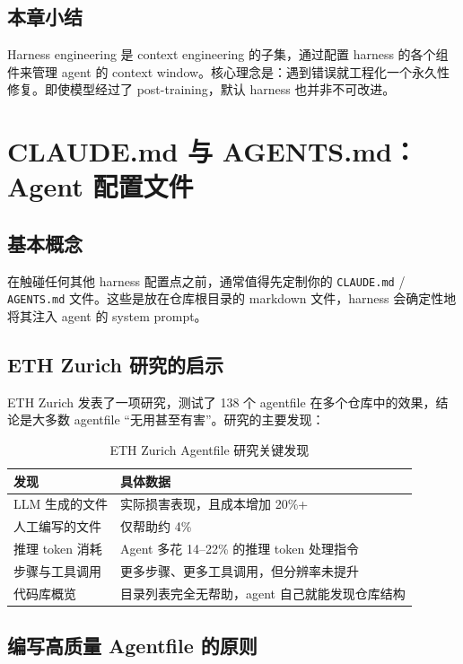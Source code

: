 \documentclass[a4paper]{article}
\begin{document}
\subsection{本章小结}

Harness engineering 是 context engineering 的子集，通过配置 harness 的各个组件来管理 agent 的 context window。核心理念是：遇到错误就工程化一个永久性修复。即使模型经过了 post-training，默认 harness 也并非不可改进。


\section{CLAUDE.md 与 AGENTS.md：Agent 配置文件}

\subsection{基本概念}

在触碰任何其他 harness 配置点之前，通常值得先定制你的 \texttt{CLAUDE.md} / \texttt{AGENTS.md} 文件。这些是放在仓库根目录的 markdown 文件，harness 会确定性地将其注入 agent 的 system prompt。

\subsection{ETH Zurich 研究的启示}

ETH Zurich 发表了一项研究，测试了 138 个 agentfile 在多个仓库中的效果，结论是大多数 agentfile ``无用甚至有害''。研究的主要发现：

\begin{table}[H]
\centering
\caption{ETH Zurich Agentfile 研究关键发现}
\begin{tabular}{@{}p{5cm}p{8cm}@{}}
\toprule
\textbf{发现} & \textbf{具体数据} \\
\midrule
LLM 生成的文件 & 实际损害表现，且成本增加 20\%+ \\
人工编写的文件 & 仅帮助约 4\% \\
推理 token 消耗 & Agent 多花 14--22\% 的推理 token 处理指令 \\
步骤与工具调用 & 更多步骤、更多工具调用，但分辨率未提升 \\
代码库概览 & 目录列表完全无帮助，agent 自己就能发现仓库结构 \\
\bottomrule
\end{tabular}
\end{table}

\subsection{编写高质量 Agentfile 的原则}
\end{document}
